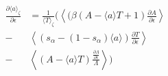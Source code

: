 \documentclass[pre,aps,twocolumn,showpacs,hyperref]{revtex4-1} %
\begin{document}
\begin{eqnarray*}
&\frac{\partial \langle a\rangle_{\zeta}}{\partial \epsilon}& = \frac{1}{\langle T \rangle_{\zeta}}\Bigg( \left\langle (\beta(A-\langle a\rangle T + 1)\frac{\partial A}{\partial \epsilon}\right\rangle \\ &-& \left\langle (s_{\alpha}-(1-s_{\alpha})\langle a\rangle)\frac{\partial T}{\partial \epsilon}\right\rangle  \\
&-&\left\langle (A-\langle a \rangle T) \frac{\frac{\partial \Lambda}{\partial \epsilon}}{\Lambda}\right\rangle \Bigg)
\end{eqnarray*}

{}
\end{document}
